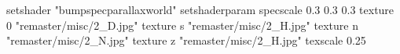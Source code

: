 setshader "bumpspecparallaxworld"
setshaderparam specscale 0.3 0.3 0.3
    texture 0 "remaster/misc/2_D.jpg"
    texture s "remaster/misc/2_H.jpg"
    texture n "remaster/misc/2_N.jpg"
    texture z "remaster/misc/2_H.jpg"
    texscale 0.25